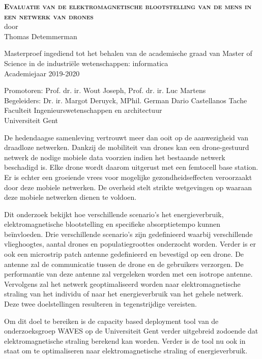 \begin{center}
\textsc{\textbf{\Huge Evaluatie van de elektromagnetische blootstelling van de mens in een netwerk van drones}}\\

door\\
Thomas Detemmerman

Masterproef ingediend tot het behalen van de academische graad van Master of Science in de
industri\"ele wetenschappen: informatica\\
Academiejaar 2019-2020

Promotoren: Prof. dr. ir. Wout Joseph, Prof. dr. ir. Luc Martens\\
Begeleiders: Dr. ir. Margot Deruyck, MPhil. German Dario Castellanos Tache\\
Faculteit Ingenieurswetenschappen en architectuur\\
Universiteit Gent
\end{center}
De hedendaagse samenleving vertrouwt meer dan ooit op de aanwezigheid van draadloze netwerken. 
Dankzij de mobiliteit van  drones kan een drone-gestuurd netwerk de nodige mobiele data voorzien 
indien het bestaande netwerk beschadigd is.
Elke drone wordt daarom uitgerust met een femtocell base station.
Er is echter een groeiende vrees voor mogelijke gezondheidseffecten veroorzaakt door deze
mobiele netwerken. De overheid stelt strikte wetgevingen op waaraan deze mobiele netwerken dienen te voldoen.

Dit onderzoek bekijkt hoe verschillende scenario's het energieverbruik, elektromagnetische blootstelling en 
specifieke absorptietempo kunnen be\"invloeden.
Drie verschillende scenario's zijn gedefinieerd waarbij verschillende vlieghoogtes, aantal drones en 
populatiegroottes onderzocht worden.
Verder is er ook een microstrip patch antenne gedefinieerd en bevestigd op een drone. 
De antenne zal de communicatie tussen de drone en de gebruikers verzorgen.
De performantie van deze antenne zal vergeleken worden met een isotrope antenne.
Vervolgens zal het netwerk geoptimaliseerd worden naar elektromagnetische straling van het individu of 
naar het energieverbruik van het gehele netwerk. Deze twee doelstellingen resulteren in 
tegenstrijdige vereisten. 

Om dit doel te bereiken is de capacity based deployment tool van de onderzoeksgroep WAVES op de 
Universiteit Gent verder uitgebreid zodoende dat elektromagnetische straling berekend kan worden.
Verder is de tool nu ook in staat om te optimaliseren naar elektromagnetische straling of energieverbruik. 

